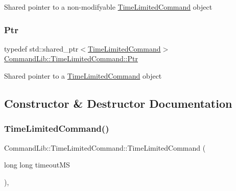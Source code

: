 Shared pointer to a non-\/modifyable \mbox{\hyperlink{class_command_lib_1_1_time_limited_command}{Time\+Limited\+Command}} object

\mbox{\label{class_command_lib_1_1_time_limited_command_aecfced587f9da8eb1493b7bbc8759b8b}} 
\subsubsection{\texorpdfstring{Ptr}{Ptr}}
{\footnotesize\ttfamily typedef std\+::shared\+\_\+ptr$<$\mbox{\hyperlink{class_command_lib_1_1_time_limited_command}{Time\+Limited\+Command}}$>$ \mbox{\hyperlink{class_command_lib_1_1_time_limited_command_aecfced587f9da8eb1493b7bbc8759b8b}{Command\+Lib\+::\+Time\+Limited\+Command\+::\+Ptr}}}



Shared pointer to a \mbox{\hyperlink{class_command_lib_1_1_time_limited_command}{Time\+Limited\+Command}} object



\subsection{Constructor \& Destructor Documentation}
\mbox{\label{class_command_lib_1_1_time_limited_command_add0fd2d4443a1c44b99e3291ae4982e3}} 
\subsubsection{\texorpdfstring{Time\+Limited\+Command()}{TimeLimitedCommand()}}
{\footnotesize\ttfamily Command\+Lib\+::\+Time\+Limited\+Command\+::\+Time\+Limited\+Command (\begin{DoxyParamCaption}\item[{long long}]{timeout\+MS }\end{DoxyParamCaption})\hspace{0.3cm}{\ttfamily [explicit]}, {\ttfamily [protected]}}



